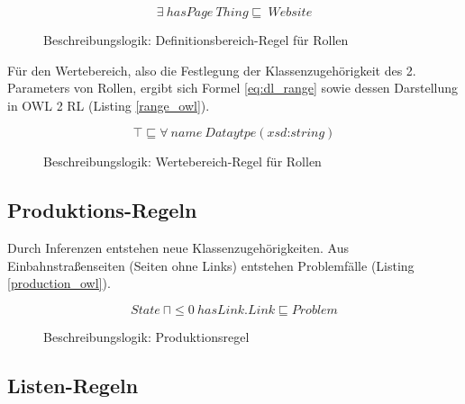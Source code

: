 \documentclass[runningheads,a4paper]{llncs}
\begin{document}
\newpage

\begin{figure}
\begin{equation}
\exists\ hasPage\ Thing \sqsubseteq\ Website
\label{eq:dl_domain}
\end{equation}
\caption{Beschreibungslogik: Definitionsbereich-Regel für Rollen}
\end{figure}



Für den Wertebereich, also die Festlegung der Klassenzugehörigkeit des 2. Parameters von Rollen, ergibt sich Formel \ref{eq:dl_range} sowie dessen Darstellung in OWL 2 RL (Listing \ref{range_owl}).

\begin{figure}
\begin{equation}
\top \sqsubseteq \forall\ name\ Dataytpe(\textit{xsd:string})
\label{eq:dl_range}
\end{equation}
\caption{Beschreibungslogik: Wertebereich-Regel für Rollen}
\end{figure}



\subsection{Produktions-Regeln}
\label{sec:rule_production}

Durch Inferenzen entstehen neue Klassenzugehörigkeiten. 
Aus Einbahnstraßenseiten (Seiten ohne Links) entstehen Problemfälle (Listing \ref{production_owl}). 
\begin{figure}
\begin{equation}
State\ \sqcap \leq 0\ hasLink.Link \sqsubseteq Problem
\label{eq:dl_infered}
\end{equation}
\caption{Beschreibungslogik: Produktionsregel}
\end{figure}



\newpage

\subsection{Listen-Regeln}
\label{sec:rule_list}
\end{document}
